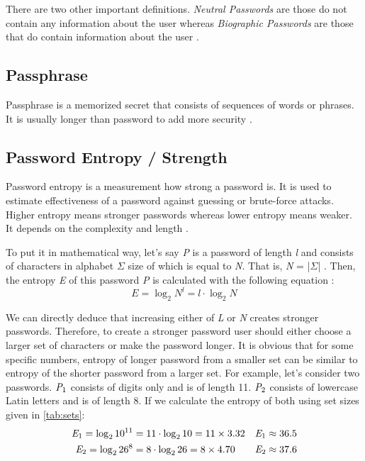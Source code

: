 \documentclass[acmsmall,nonacm]{acmart}
\begin{document}
There are two other important definitions. \emph{Neutral Passwords} are those do not contain any information about the user whereas \emph{Biographic Passwords} are those that do contain information about the user \cite{Kavrestad_2019}.

\subsection{Passphrase} \label{passphrase}

Passphrase is a memorized secret that consists of sequences of words or phrases. It is usually longer than password to add more security \cite{passphrase_def}.

\subsection{Password Entropy / Strength} \label{entropy}
Password entropy is a measurement how strong a password is. It is used to estimate effectiveness of a password against guessing or brute-force attacks. Higher entropy means stronger passwords whereas lower entropy means weaker. It depends on the complexity and length \cite{hu_2018}.

To put it in mathematical way, let's say \emph{P} is a password of length \emph{l} and consists of characters in alphabet $\Sigma$ size of which is equal to \emph{N}. That is, \emph{N} = |$\Sigma$| . Then, the entropy \emph{E} of this password \emph{P} is calculated with the following equation :
\begin{equation} \label{eq:1}
E = \log_2 N^l = l \cdot \log_2 N
\end{equation}

We can directly deduce that increasing either of \emph{L} or \emph{N} creates stronger passwords. Therefore, to create a stronger password user should either choose a larger set of characters or make the password longer. It is obvious that for some specific numbers, entropy of longer password from a smaller set can be similar to entropy of the shorter password from a larger set. For example, let's consider two passwords. $\emph{P}_1$ consists of digits only and is of length 11. $\emph{P}_2$ consists of lowercase Latin letters and is of length 8. If we calculate the entropy of both using set sizes given in \autoref{tab:sets}:
\begin{align*}\label{eq:p1p2calc}
    \emph{E}_1 = \log_2 10^{11} &= 11 \cdot \log_2 10 = 11 \times 3.32 &\emph{E}_1 \approx 36.5 \\
    \emph{E}_2 = \log_2 26^8  &= 8  \cdot \log_2 26   = 8 \times 4.70 &\emph{E}_2 \approx 37.6
\end{align*}
\end{document}
